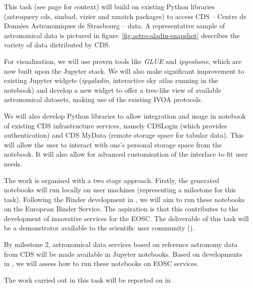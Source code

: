 \begin{task}[
  title=Demonstrator: Astronomy,
  id=astro,
  lead=CDS,
  PM=18,
  wphases={18-42},
  partners={EGI,INSERM,QS,SRL,WTT,XFEL}
]

  This task (see page \pageref{sec:concept-demonstrator-astronomy} for
  context) will build on existing Python libraries (astroquery cds, simbad, 
  vizier and xmatch packages) to access CDS -- Centre de Donn\'ees 
  Astronomiques de Strasbourg -- data. A representative sample of astronomical data is pictured in figure~\ref{fig:astro-aladin-snapshot}
  describes the variety of data distributed by CDS.

  For visualization, we will
  use proven tools like \textit{GLUE} and \textit{ipyvolume}, which are now
  built upon the Jupyter stack.
  We will also make significant improvement to existing Jupyter widgets
  (\textit{ipyaladin}, interactive sky atlas running in the notebook) and
  develop a new widget to offer a tree-like view of available
  astronomical datasets, making use of the existing IVOA \cite{ivoa} 
  protocols.

  We will also develop Python libraries to allow integration and usage in
  notebook of existing CDS infrastructure services, namely CDSLogin (which
  provides authentication) and CDS MyData (remote storage space for tabular
  data).
  This will allow the user to interact with one's personal storage space from
  the notebook. It will also allow for advanced customisation of the interface
  to fit user needs.

  The work is organised with a two stage approach. Firstly, the generated
  notebooks will run locally on user machines (representing a milestone for
  this task). Following the Binder development in , we will aim
  to run these notebooks on the European Binder Service. The aspiration is
  that this contributes to the development of innovative services for the EOSC.
  The deliverable of this task will be a demonstrator available to the
  scientific user community ().

  By milestone 2, astronomical data services based on reference
  astronomy data from CDS will be made available in Jupyter notebooks.
  Based on developments in , we will assess how to run these
  notebooks on \TheProject EOSC services.

  The work carried out in this task will be reported on in
  .
\end{task}
